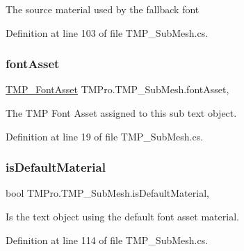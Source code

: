 The source material used by the fallback font 



Definition at line 103 of file T\+M\+P\+\_\+\+Sub\+Mesh.\+cs.

\mbox{\label{class_t_m_pro_1_1_t_m_p___sub_mesh_a964077af399140595270238950a3b931}} 
\subsubsection{\texorpdfstring{fontAsset}{fontAsset}}
{\footnotesize\ttfamily \mbox{\hyperlink{class_t_m_pro_1_1_t_m_p___font_asset}{T\+M\+P\+\_\+\+Font\+Asset}} T\+M\+Pro.\+T\+M\+P\+\_\+\+Sub\+Mesh.\+font\+Asset\hspace{0.3cm}{\ttfamily [get]}, {\ttfamily [set]}}



The T\+MP Font Asset assigned to this sub text object. 



Definition at line 19 of file T\+M\+P\+\_\+\+Sub\+Mesh.\+cs.

\mbox{\label{class_t_m_pro_1_1_t_m_p___sub_mesh_a5eaf8dd69cecbc5c96bcc5ea3b8489ef}} 
\subsubsection{\texorpdfstring{isDefaultMaterial}{isDefaultMaterial}}
{\footnotesize\ttfamily bool T\+M\+Pro.\+T\+M\+P\+\_\+\+Sub\+Mesh.\+is\+Default\+Material\hspace{0.3cm}{\ttfamily [get]}, {\ttfamily [set]}}



Is the text object using the default font asset material. 



Definition at line 114 of file T\+M\+P\+\_\+\+Sub\+Mesh.\+cs.

\mbox{\label{class_t_m_pro_1_1_t_m_p___sub_mesh_ad2670c4fc01057065ace1cbd7e48aa62}} 
